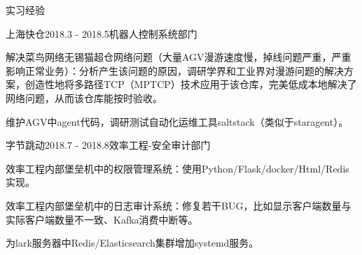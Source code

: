 \documentclass{resume} %
\begin{document}
\begin{rSection}{实习经验}

\begin{rSubsection}{上海快仓}{2018.3 - 2018.5}{机器人控制系统部门}{}
\item 解决菜鸟网络无锡猫超仓网络问题（大量AGV漫游速度慢，掉线问题严重，严重影响正常业务）：分析产生该问题的原因，调研学界和工业界对漫游问题的解决方案，创造性地将多路径TCP（MPTCP）技术应用于该仓库，完美低成本地解决了网络问题，从而该仓库能按时验收。
\item 维护AGV中agent代码，调研测试自动化运维工具saltstack（类似于staragent）。
\end{rSubsection}



\begin{rSubsection}{字节跳动}{2018.7 - 2018.8}{效率工程-安全审计部门}{}
\item 效率工程内部堡垒机中的权限管理系统：使用Python/Flask/docker/Html/Redis实现。
\item 效率工程内部堡垒机中的日志审计系统：修复若干BUG，比如显示客户端数量与实际客户端数量不一致、Kafka消费中断等。
\item 为lark服务器中Redis/Elasticsearch集群增加systemd服务。
\end{rSubsection}

\end{rSection}


\end{document}
